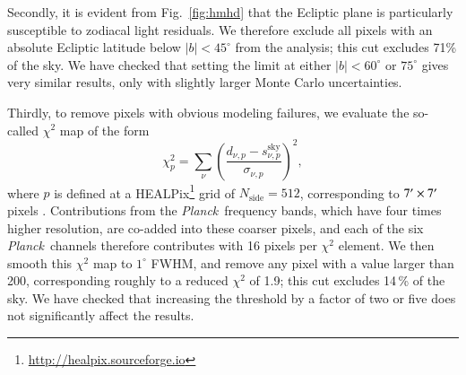 \documentclass{aa}
\def\Planck{\textit{Planck}}
\begin{document}
Secondly, it is evident from Fig.~\ref{fig:hmhd} that the Ecliptic
plane is particularly susceptible to zodiacal light residuals. We
therefore exclude all pixels with an absolute Ecliptic latitude below
$|b|<45^{\circ}$ from the analysis; this cut excludes 71\% of the
sky. We have checked that setting the limit at either $|b|<60^{\circ}$
or $75^{\circ}$ gives very similar results, only with slightly larger
Monte Carlo uncertainties.

Thirdly, to remove pixels with obvious modeling failures, we
evaluate the so-called $\chi^2$ map of the form
\begin{equation}
\chi_p^2 = \sum_{\nu} \left(\frac{d_{\nu,p}-s_{\nu,p}^{\mathrm{sky}}}{\sigma_{\nu,p}}\right)^2,
\end{equation}
where $p$ is defined at a HEALPix\footnote{\url{http://healpix.sourceforge.io}} grid of $N_{\mathrm{side}}=512$,
corresponding to $7\arcmin\times 7\arcm$ pixels
\citep{healpix}. Contributions from the \Planck\ frequency bands,
which have four times higher resolution, are co-added into these
coarser pixels, and each of the six \Planck\ channels therefore
contributes with 16 pixels per $\chi^2$ element. We then smooth this
$\chi^2$ map to $1^{\circ}$ FWHM, and remove any pixel with a value
larger than 200, corresponding roughly to a reduced $\chi^2$ of 1.9;
this cut excludes 14\,\% of the sky. We have checked that increasing the
threshold by a factor of two or five does not significantly affect the
results.
\end{document}
